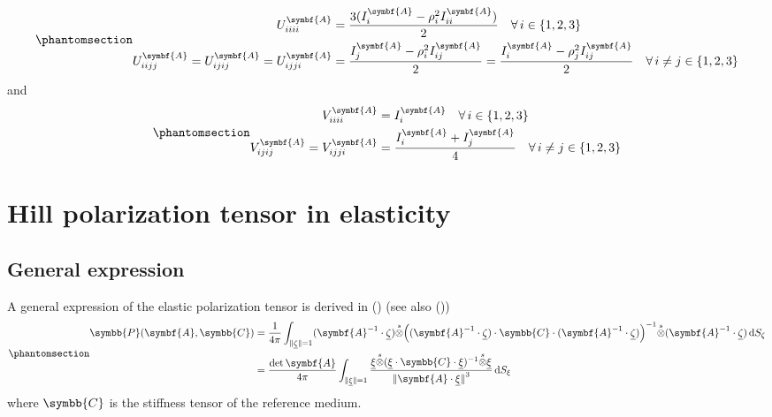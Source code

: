 \documentclass[
  a4paper,
  numbers=noendperiod,
  DIV=12]{scrreprt}
\newcommand{\uu}[1]{{\symbf{{#1}}}}
\newcommand{\uuuu}[1]{{\symbb{{#1}}}}
\newcommand{\uv}[1]{{\underline{{#1}}}}
\newcommand{\sotimes}{{\stackrel{s}{\otimes}}}
\newcommand{\norm}[1]{{\lVert{{#1}}\rVert}}
\newcommand{\ud}{{\,\mathrm{d}}}
\begin{document}
\begin{tcolorbox}[enhanced jigsaw, arc=.35mm, bottomrule=.15mm, bottomtitle=1mm, breakable, colback=white, colbacktitle=quarto-callout-note-color!10!white, colframe=quarto-callout-note-color-frame, coltitle=black, left=2mm, leftrule=.75mm, opacityback=0, opacitybacktitle=0.6, rightrule=.15mm, title=\textcolor{quarto-callout-note-color}{\faInfo}\hspace{0.5em}{Generic expressions of the non-zero components of \(\uuuu{U}^{\uu{A}}\)
and \(\uuuu{V}^{\uu{A}}\) (click for details)}, titlerule=0mm, toprule=.15mm, toptitle=1mm]

\begin{equation}\protect\phantomsection\label{eq-Uijkl}{\begin{align}
U^{\uu{A}}_{iiii}&=\frac{3(I^{\uu{A}}_i-\rho_i^2I^{\uu{A}}_{ii})}{2} 
\quad\forall\, i\in\{1,2,3\}\\
U^{\uu{A}}_{iijj}=U^{\uu{A}}_{ijij}=U^{\uu{A}}_{ijji}&=\frac{I^{\uu{A}}_j-\rho_i^2I^{\uu{A}}_{ij}}{2} 
=\frac{I^{\uu{A}}_i-\rho_j^2I^{\uu{A}}_{ij}}{2}
\quad\forall\, i\neq j\in\{1,2,3\}
\end{align}}\end{equation} and
\begin{equation}\protect\phantomsection\label{eq-Vijkl}{\begin{align}
V^{\uu{A}}_{iiii}&=I^{\uu{A}}_i\quad\forall\, i\in\{1,2,3\}\\
V^{\uu{A}}_{ijij}=V^{\uu{A}}_{ijji}&=\frac{I^{\uu{A}}_i+I^{\uu{A}}_j}{4}
\quad\forall\, i\neq j\in\{1,2,3\}
\end{align}}\end{equation}

\end{tcolorbox}

\section{Hill polarization tensor in
elasticity}\label{hill-polarization-tensor-in-elasticity}

\subsection{General expression}\label{general-expression}

A general expression of the elastic polarization tensor is derived in
() (see also
())
\begin{equation}\protect\phantomsection\label{eq-Hill}{\begin{align}
\uuuu{P}(\uu{A},\uuuu{C})&=\frac{1}{4\pi}
\int_{\norm{\uv{\zeta}}=1}
(\uu{A}^{-1}\cdot\uv{\zeta})\sotimes
\Big((\uu{A}^{-1}\cdot\uv{\zeta})\cdot\uuuu{C}
\cdot(\uu{A}^{-1}\cdot\uv{\zeta})\Big)^{-1}
\sotimes(\uu{A}^{-1}\cdot\uv{\zeta})
\ud S_\zeta\\
&=
\frac{\det{\uu{A}}}{4\pi}
\int_{\norm{\uv{\xi}}=1}
\frac{\uv{\xi}\sotimes
(\uv{\xi}\cdot\uuuu{C}
\cdot\uv{\xi})^{-1}
\sotimes\uv{\xi}}{\norm{\uu{A}\cdot\uv{\xi}}^3}
\ud S_{\xi}
\end{align}}\end{equation} where \(\uuuu{C}\) is the stiffness tensor of
the reference medium.
\end{document}
